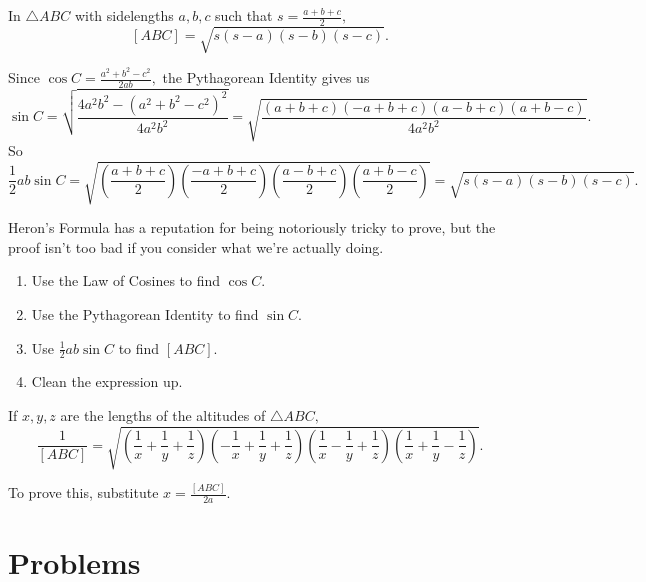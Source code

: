 \documentclass[blue,onecol]{shooting}
\begin{document}
\begin{theo}
In $\triangle ABC$ with sidelengths $a,b,c$ such that $s=\frac{a+b+c}{2},$
\[[ABC]=\sqrt{s(s-a)(s-b)(s-c)}.\]
\end{theo}

\begin{pro}
Since $\cos C=\frac{a^2+b^2-c^2}{2ab},$ the Pythagorean Identity gives us \[\sin C=\sqrt{\frac{4a^2b^2-(a^2+b^2-c^2)^2}{4a^2b^2}}=\sqrt{\frac{(a+b+c)(-a+b+c)(a-b+c)(a+b-c)}{4a^2b^2}}.\] So \[\frac{1}{2}ab\sin C=\sqrt{\left(\frac{a+b+c}{2}\right)\left(\frac{-a+b+c}{2}\right)\left(\frac{a-b+c}{2}\right)\left(\frac{a+b-c}{2}\right)}=\sqrt{s(s-a)(s-b)(s-c)}.\]
\end{pro}

Heron's Formula has a reputation for being notoriously tricky to prove, but the proof isn't too bad if you consider what we're actually doing.
\begin{enumerate}
	\item Use the Law of Cosines to find $\cos C.$
	
	\item Use the Pythagorean Identity to find $\sin C.$
	
	\item Use $\frac{1}{2}ab\sin C$ to find $[ABC].$
	
	\item Clean the expression up.
\end{enumerate}

\begin{fact}
If $x,y,z$ are the lengths of the altitudes of $\triangle ABC,$
\[\frac{1}{[ABC]}=\sqrt{\left(\frac{1}{x}+\frac{1}{y}+\frac{1}{z}\right)\left(-\frac{1}{x}+\frac{1}{y}+\frac{1}{z}\right)\left(\frac{1}{x}-\frac{1}{y}+\frac{1}{z}\right)\left(\frac{1}{x}+\frac{1}{y}-\frac{1}{z}\right)}.\]
\end{fact}

To prove this, substitute $x=\frac{[ABC]}{2a}.$

\pagebreak

\section{Problems}



    
\end{document}
